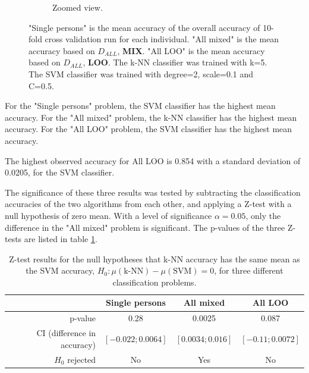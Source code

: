 \begin{figure}[ht]
\begin{subfigure}{0.95\textwidth}
\caption[k-NN and SVM classification accuracies, zoomed view.]
{
Zoomed view.
}
\label{fig:knn-vs-svm-zoomed}
\end{subfigure}
\caption[k-NN and SVM classification accuracies]{
"Single persons" is the mean accuracy of the overall accuracy of 10-fold cross validation run for each individual.
"All mixed" is the mean accuracy based on $D_{ALL}$, \textbf{MIX}.
"All LOO" is the mean accuracy based on $D_{ALL}$, \textbf{LOO}.
The k-NN classifier was trained with k=5. The SVM classifier was trained with degree=2, scale=0.1 and C=0.5.
}
\end{figure}

For the "Single persons" problem, the SVM classifier has the highest mean accuracy.
For the "All mixed" problem, the k-NN classifier has the highest mean accuracy.
For the "All LOO" problem, the SVM classifier has the highest mean accuracy.

The highest observed accuracy for All LOO is 0.854 with a standard
deviation of 0.0205, for the SVM classifier.

The significance of these three results was tested by subtracting the classification
accuracies of the two algorithms from each other,
and applying a Z-test with a null hypothesis of zero mean.
With a level of significance \(\alpha=0.05\),
only the difference in the "All mixed" problem is significant.
The p-values of the three Z-tests are listed in table \ref{tb:ztest}.
\begin{table}[ht]
\centering
\caption[Z-test results]
{
Z-test results for the null hypotheses that k-NN accuracy has
the same mean as the SVM accuracy, \(H_0:\mu\left(\text{k-NN}\right)-\mu\left(\text{SVM}\right)=0\), for three different classification problems.
}
\begin{tabular}{|r||c|c|c|}
\hline
 & Single persons & All mixed & All LOO
 \\
 \hline
p-value & 0.28 & 0.0025 & 0.087
\\
CI (difference in accuracy)& \(\left[-0.022;0.0064\right]\)
& \(\left[0.0034;0.016\right]\)
& \(\left[-0.11;0.0072\right]\)
\\
\(H_0\) rejected & No & Yes & No
\\
\hline
\end{tabular}
\label{tb:ztest}
\end{table}


